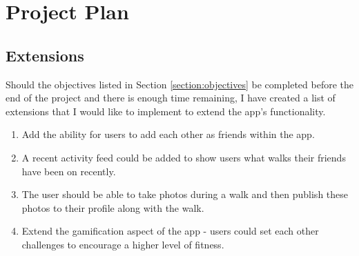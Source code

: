 \chapter{Project Plan}

\section{Extensions}

Should the objectives listed in Section \ref{section:objectives} be completed before the end of the project and there is enough time remaining, I have created a list of extensions that I would like to implement to extend the app's functionality.

\begin{enumerate}[label=\textbf{Ext \arabic*}]
  \item Add the ability for users to add each other as friends within the app.
  \item A recent activity feed could be added to show users what walks their friends have been on recently.
  \item The user should be able to take photos during a walk and then publish these photos to their profile along with the walk.
  \item Extend the gamification aspect of the app - users could set each other challenges to encourage a higher level of fitness.
\end{enumerate}